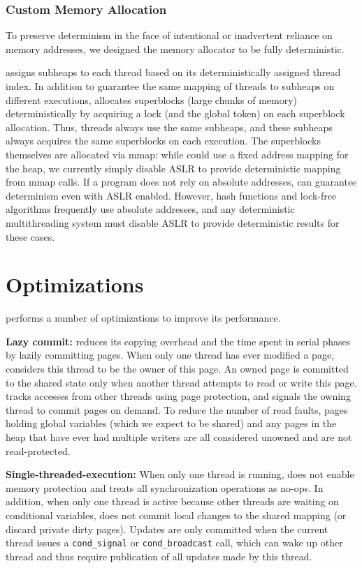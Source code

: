 \subsubsection{Custom Memory Allocation}

To preserve determinism in the face of intentional or inadvertent reliance on memory addresses, we designed the \dthreads{} memory allocator to be fully deterministic. 

\dthreads{} assigns subheaps to each thread based on its deterministically assigned thread index. In addition to guarantee the same mapping of threads to subheaps on different executions, \dthreads{} allocates superblocks (large chunks of memory) deterministically by acquiring a lock (and the global token) on each superblock allocation. Thus, threads always use the same subheaps, and these subheaps always acquires the same superblocks on each execution. The superblocks themselves are allocated via mmap: while \dthreads{} could use a fixed address mapping for the heap, we currently simply disable ASLR to provide deterministic mapping from mmap calls. If a program does not rely on absolute addresses, \dthreads{} can guarantee determinism even with ASLR enabled. However, hash functions and lock-free algorithms frequently use absolute addresses, and any deterministic multithreading system must disable ASLR to provide deterministic results for these cases.


\section{Optimizations}
\label{sec:dthreads-optimization}

\dthreads{} performs a number of optimizations to improve its performance.

\textbf{Lazy commit:} \dthreads{} reduces its copying overhead and the time spent in serial phases by lazily committing pages. When only one thread has ever modified a page, \dthreads{} considers this thread to be the owner of this page. An owned page is committed to the shared state only when another thread attempts to read or write this page. \dthreads{} tracks accesses from other threads using page protection, and signals the owning thread to commit pages on demand. To reduce the number of read faults, pages holding global variables (which we expect to be shared) and any pages in the heap that have ever had multiple writers are all considered unowned and are not read-protected.

\textbf{Single-threaded-execution: }
When only one thread is running, \dthreads{} does not enable memory protection and treats all synchronization operations as no-ops. In addition, when only one thread is active because other threads are waiting on conditional variables, \dthreads{} does not commit local changes to the shared mapping (or discard private dirty pages). Updates are only committed when the current thread issues a \texttt{cond\_signal} or \texttt{cond\_broadcast} call, which can wake up other thread and thus require publication of all updates made by this thread.

